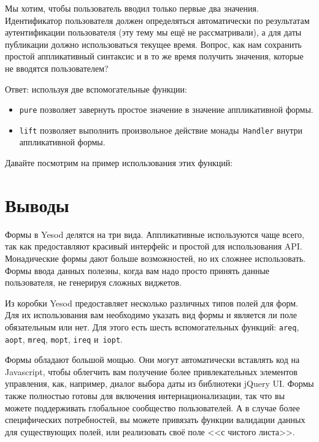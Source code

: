 Мы хотим, чтобы пользователь вводил только первые два значения. Идентификатор
пользователя должен определяться автоматически по результатам аутентификации
пользователя (эту тему мы ещё не рассматривали), а для даты публикации должно
использоваться текущее время. Вопрос, как нам сохранить простой аппликативный
синтаксис и в то же время получить значения, которые не вводятся пользователем?

Ответ: используя две вспомогательные функции:
\begin{itemize}
    \item \lstinline'pure' позволяет завернуть простое значение в значение
        аппликативной формы.

    \item \lstinline'lift' позволяет выполнить произвольное действие
        монады~\lstinline'Handler' внутри аппликативной формы.
\end{itemize}

Давайте посмотрим на пример использования этих функций:

\section{Выводы}
Формы в Yesod делятся на три вида. Аппликативные используются чаще всего, так
как предоставляют красивый интерфейс и простой для использования API.
Монадические формы дают больше возможностей, но их сложнее использовать. Формы
ввода данных полезны, когда вам надо просто принять данные пользователя, не
генерируя сложных виджетов.

Из коробки Yesod предоставляет несколько различных типов полей для форм. Для их
использования вам необходимо указать вид формы и является ли поле обязательным
или нет. Для этого есть шесть вспомогательных функций: \lstinline'areq',
\lstinline'aopt', \lstinline'mreq', \lstinline'mopt', \lstinline'ireq'
и~\lstinline'iopt'.

Формы обладают большой мощью. Они могут автоматически вставлять код на
Javascript, чтобы облегчить вам получение более привлекательных элементов
управления, как, например, диалог выбора даты из библиотеки jQuery UI. Формы
также полностью готовы для включения интернационализации, так что вы можете
поддерживать глобальное сообщество пользователей. А в случае более
специфических потребностей, вы можете привязать функции валидации данных для
существующих полей, или реализовать своё поле <<с чистого листа>>.
